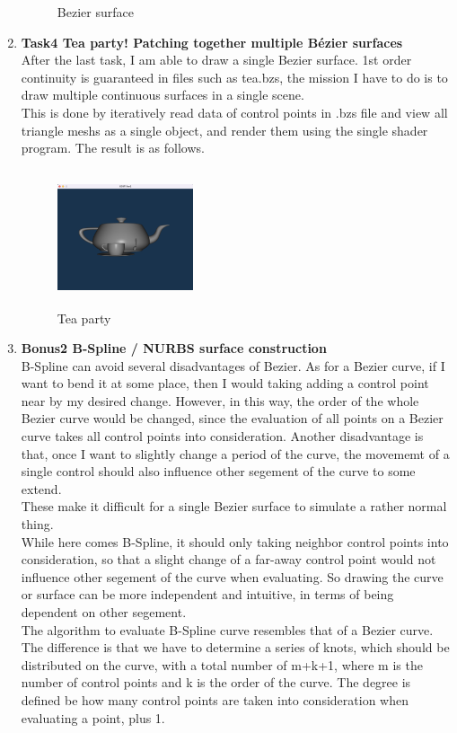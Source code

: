 \documentclass[acmtog]{acmart}
\begin{document}
\begin{enumerate}
\begin{figure}[h]
		\caption{Bezier surface}
	\end{figure}
	\item \textbf{Task4 Tea party! Patching together multiple Bézier surfaces}\\
	After the last task, I am able to draw a single Bezier surface. 1st order continuity is guaranteed in files such as tea.bzs, the mission I have to do is to draw multiple continuous surfaces in a single scene.\\
	This is done by iteratively read data of control points in .bzs file and view all triangle meshs as a single object, and render them using the single shader program. The result is as follows.\\
	\begin{figure}[h]
		\includegraphics[width=4cm,height=4cm]{teaparty.png}
		\caption{Tea party}
	\end{figure}
	\item \textbf{Bonus2 B-Spline / NURBS surface construction}\\
	B-Spline can avoid several disadvantages of Bezier. As for a Bezier curve, if I want to bend it at some place, then I would taking adding a control point near by my desired change. However, in this way, the order of the whole Bezier curve would be changed, since the evaluation of all points on a Bezier curve takes all control points into consideration.
	Another disadvantage is that, once I want to slightly change a period of the curve, the movememt of a single control should also influence other segement of the curve to some extend.\\
	These make it difficult for a single Bezier surface to simulate a rather normal thing.\\
	While here comes B-Spline, it should only taking neighbor control points into consideration, so that a slight change of a far-away control point would not influence other segement of the curve when evaluating. So drawing the curve or surface can be more independent and intuitive, in terms of being dependent on other segement.\\
	The algorithm to evaluate B-Spline curve resembles that of a Bezier curve. The difference is that we have to determine a series of knots, which should be distributed on the curve, with a total number of m+k+1, where m is the number of control points and k is the order of the curve. The degree is defined be how many control points are taken into consideration when evaluating a point, plus 1.\\

\end{enumerate}
\end{document}
